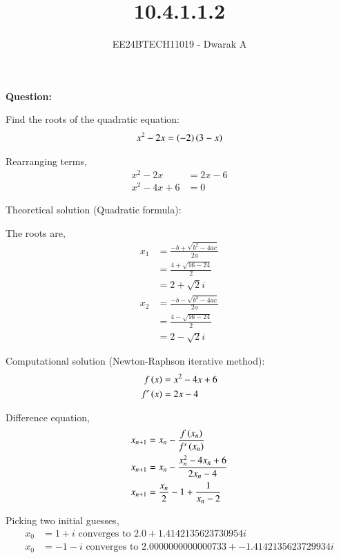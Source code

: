 \documentclass[journal]{IEEEtran}
\begin{document}

\vspace{3cm}

\title{10.4.1.1.2}
\author{EE24BTECH11019 - Dwarak A}
{\let\newpage\relax\maketitle}

\renewcommand{\thefigure}{\theenumi}
\renewcommand{\thetable}{\theenumi}
\setlength{\intextsep}{10pt} %


\renewcommand{\thetable}{\theenumi}

\textbf{Question:}

Find the roots of the quadratic equation:
\begin{align}
    x^2 - 2x = \left(-2\right)\left(3-x\right)
\end{align}

\solution

Rearranging terms,
\begin{align}
    x^2 - 2x &= 2x - 6 \\
    x^2 - 4x + 6 &= 0
\end{align}

Theoretical solution (Quadratic formula):

The roots are,
\begin{align}
    x_1 &= \frac{-b+\sqrt{b^2 - 4ac}}{2a} \\
    &= \frac{4+\sqrt{16-24}}{2} \\
    &= 2+\sqrt{2}i \\
    x_2 &= \frac{-b-\sqrt{b^2 - 4ac}}{2a} \\
    &= \frac{4-\sqrt{16-24}}{2} \\
    &= 2-\sqrt{2}i
\end{align}

Computational solution (Newton-Raphson iterative method):
\begin{align}
    f\left(x\right) &= x^2 - 4x + 6 \\
    f^\prime\left(x\right) &= 2x - 4
\end{align}

Difference equation,
\begin{align}
    x_{n+1} &= x_n - \frac{f\left(x_{n}\right)}{f^\prime\left(x_n\right)} \\
    x_{n+1} &= x_n - \frac{x_n^2 - 4x_n + 6}{2x_n - 4} \\
    x_{n+1} &= \frac{x_n}{2} - 1 + \frac{1}{x_n - 2}
\end{align}

Picking two initial guesses,
\begin{align}
    x_0 &= 1+i \text{ converges to } 2.0 + 1.4142135623730954i \\
    x_0 &= -1-i \text{ converges to } 2.0000000000000733 + -1.4142135623729934i
\end{align}
\end{document}
